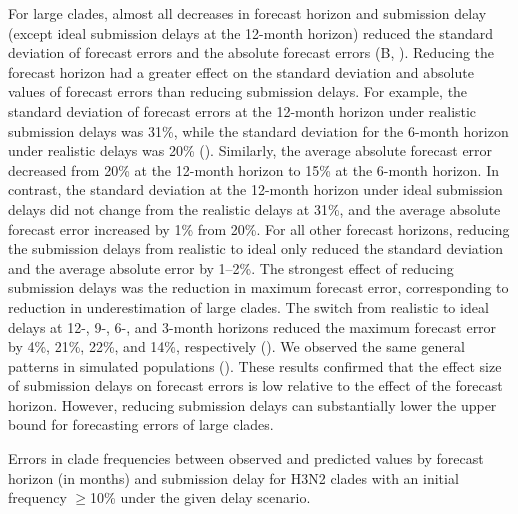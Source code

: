 \documentclass[9pt,lineno]{elife}
\begin{document}
\begin{figure}[htb]
%
\label{figdata:h3n2_clade_frequencies}
\label{figsrccode:forecast_clade_frequency_errors}
\end{figure}

For large clades, almost all decreases in forecast horizon and submission delay (except ideal submission delays at the 12-month horizon) reduced the standard deviation of forecast errors and the absolute forecast errors (B, ).
Reducing the forecast horizon had a greater effect on the standard deviation and absolute values of forecast errors than reducing submission delays.
For example, the standard deviation of forecast errors at the 12-month horizon under realistic submission delays was 31\%, while the standard deviation for the 6-month horizon under realistic delays was 20\% ().
Similarly, the average absolute forecast error decreased from 20\% at the 12-month horizon to 15\% at the 6-month horizon.
In contrast, the standard deviation at the 12-month horizon under ideal submission delays did not change from the realistic delays at 31\%, and the average absolute forecast error increased by 1\% from 20\%.
For all other forecast horizons, reducing the submission delays from realistic to ideal only reduced the standard deviation and the average absolute error by 1--2\%.
The strongest effect of reducing submission delays was the reduction in maximum forecast error, corresponding to reduction in underestimation of large clades.
The switch from realistic to ideal delays at 12-, 9-, 6-, and 3-month horizons reduced the maximum forecast error by 4\%, 21\%, 22\%, and 14\%, respectively ().
We observed the same general patterns in simulated populations ().
These results confirmed that the effect size of submission delays on forecast errors is low relative to the effect of the forecast horizon.
However, reducing submission delays can substantially lower the upper bound for forecasting errors of large clades.

\begin{table}[htb]
  \begin{center}
    
    \caption{Errors in clade frequencies between observed and predicted values by forecast horizon (in months) and submission delay for H3N2 clades with an initial frequency $\geq$10\% under the given delay scenario.}
    \label{tab:h3n2_forecast_clade_frequency_errors}
  \end{center}
\end{table}
\end{document}

